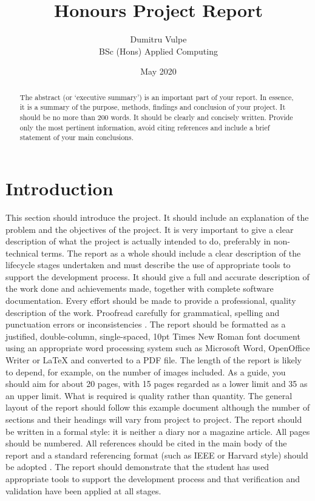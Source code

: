 \documentclass[twocolumn]{article}
\title{Honours Project Report}
\author{Dumitru Vulpe\\BSc (Hons) Applied Computing}
\date{May 2020}
\begin{document}
\maketitle


\begin{abstract}
The abstract (or ‘executive summary’) is an important part of your report. In essence, it is a summary of the purpose, methods, findings and conclusion of your project. It should be no more than 200 words. It should be clearly and concisely written. Provide only the most pertinent information, avoid citing references and include a brief statement of your main conclusions.  
\end{abstract}


\section{Introduction}
\vspace{-1ex}

This section should introduce the project. It should include an explanation of the problem and the objectives of the project. It is very important to give a clear description of what the project is actually intended to do, preferably in non-technical terms. The report as a whole should include a clear description of the lifecycle stages undertaken and must describe the use of appropriate tools to support the development process. It should give a full and accurate description of the work done and achievements made, together with complete software documentation. Every effort should be made to provide a professional, quality description of the work. Proofread carefully for grammatical, spelling and punctuation errors or inconsistencies \cite{BBC}. The report should be formatted as a justified, double-column, single-spaced, 10pt Times New Roman font document using an appropriate word processing system such as Microsoft Word, OpenOffice Writer or LaTeX and converted to a PDF file. The length of the report is likely to depend, for example, on the number of images included. As a guide, you should aim for about 20 pages, with 15 pages regarded as a lower limit and 35 as an upper limit. What is required is quality rather than quantity. The general layout of the report should follow this example document although the number of sections and their headings will vary from project to project. The report should be written in a formal style: it is neither a diary nor a magazine article. All pages should be numbered. All references should be cited in the main body of the report and a standard referencing format (such as IEEE or Harvard style) should be adopted \cite{Wilde}. The report should demonstrate that the student has used appropriate tools to support the development process and that verification and validation have been applied at all stages. 
	
\end{document}

